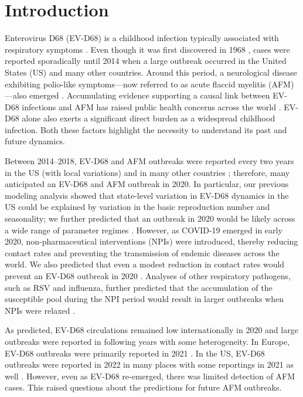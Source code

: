 \documentclass[12pt]{article}
\begin{document}
\pagebreak

\section{Introduction}

Enterovirus D68 (EV-D68) is a childhood infection typically associated with respiratory symptoms \citep{oberste2004enterovirus}.
Even though it was first discovered in 1968 \citep{schieble1967probable}, cases were reported sporadically until 2014 when a large outbreak occurred in the United States (US) \citep{messacar20162014} and many other countries.
Around this period, a neurological disease exhibiting polio-like symptoms---now referred to as acute flaccid myelitis (AFM)---also emerged \citep{roux2014polio, mckay2018increase}.
Accumulating evidence supporting a causal link between EV-D68 infections and AFM has raised public health concerns across the world \citep{dyda2018association,messacar2018enterovirus,park2021epidemiological,vogt2022enterovirus,aguglia2023contemporary}.
EV-D68 alone also exerts a significant direct burden as a widespread childhood infection.
Both these factors highlight the necessity to understand its past and future dynamics.

Between 2014--2018, EV-D68 and AFM outbreaks were reported every two years in the US (with local variations) and in many other countries \citep{messacar2019continued};
therefore, many anticipated an EV-D68 and AFM outbreak in 2020.
In particular, our previous modeling analysis showed that state-level variation in EV-D68 dynamics in the US could be explained by variation in the basic reproduction number and seasonality; we further predicted that an outbreak in 2020 would be likely across a wide range of parameter regimes \citep{park2021epidemiological}.
However, as COVID-19 emerged in early 2020, non-pharmaceutical interventions (NPIs) were introduced, thereby reducing contact rates and preventing the transmission of endemic diseases across the world.
We also predicted that even a modest reduction in contact rates would prevent an EV-D68 outbreak in 2020 \citep{park2021epidemiological}.
Analyses of other respiratory pathogens, such as RSV and influenza, further predicted that the accumulation of the susceptible pool during the NPI period would result in larger outbreaks when NPIs were relaxed \citep{baker2020impact}.

As predicted, EV-D68 circulations remained low internationally in 2020 and large outbreaks were reported in following years with some heterogeneity.
In Europe, EV-D68 outbreaks were primarily reported in 2021 \citep{benschop2021re,andres2022enterovirus}.
In the US, EV-D68 outbreaks were reported in 2022 in many places \citep{ma2022increase} with some reportings in 2021 as well \citep{fall2022circulation}.
However, even as EV-D68 re-emerged, there was limited detection of AFM cases.
This raised questions about the predictions for future AFM outbreaks.
\end{document}
